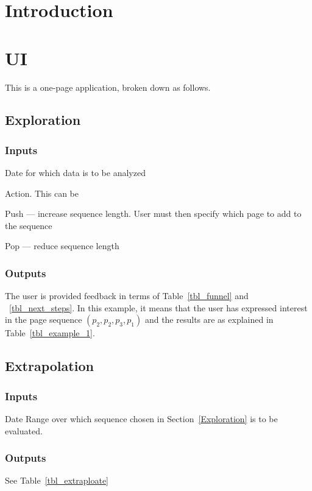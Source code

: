 \usepackage{hyperref}

\section{Introduction}

\TBC

\section{UI}
This is a one-page application, broken down as follows.
\subsection{Exploration}
\subsubsection{Inputs}
\be
\item Date for which data is to be analyzed
\item Action. This can be 
\be
\item Push --- increase sequence length. User must then specify which
page to add to the sequence
\item Pop --- reduce sequence length
\ee
\ee
\subsubsection{Outputs}
The user is provided feedback in terms of Table~\ref{tbl_funnel} and
~\ref{tbl_next_steps}. In this example, it means that the user has
expressed interest in the page sequence \((p_2, p_2, p_3, p_1)\) and
the results are as explained in Table~\ref{tbl_example_1}.

\subsection{Extrapolation}

\subsubsection{Inputs}
\be
\item Date Range over which sequence chosen in Section~\ref{Exploration}
is to be evaluated. 
\ee
\subsubsection{Outputs}
See Table~\ref{tbl_extraploate}


